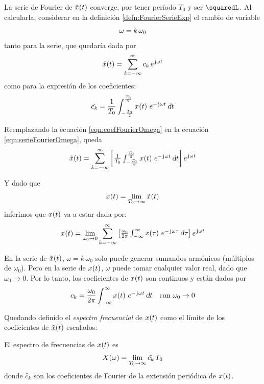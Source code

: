 La serie de Fourier de $\fx[\tilde{x}]{t}$ converge, por tener período $T_0$ y ser $\squaredL$.
Al calcularla, considerar en la definición \ref{defn:FourierSerieExp} el cambio de variable
\[
    \omega = \kth \, \omega_0
\]
tanto para la serie, que quedaría dada por
\begin{equation}
    \fx[\tilde{x}]{t}
    = \sum_{\kth=-\infty}^\infty
    c_\kth \, \complexExp
    \label{eqn:serieFourierOmega}
\end{equation}
como para la expresión de los coeficientes:
\begin{equation}
    \tilde{c_\kth} =
    \frac{1}{T_0}
    \int_{-\frac{T_0}{2}}^{\frac{T_0}{2}} \fx[x]{t} \, e^{- \iu \omega t}
    \, \dif t
    \label{eqn:coefFourierOmega}
\end{equation}

Reemplazando la ecuación \ref{eqn:coefFourierOmega} en la ecuación \ref{eqn:serieFourierOmega}, queda
\[
    \fx[\tilde{x}]{t}
    = \sum_{\kth=-\infty}^\infty
    \inBrackets{
    \frac{1}{T_0}
    \int_{-\frac{T_0}{2}}^{\frac{T_0}{2}} \fx[x]{t} \, e^{- \iu \omega t}
    \, \dif t
    }
    \, \complexExp
\]

Y dado que
\[
    \fx[x]{t} = \lim_{T_0 \to \infty} \fx[\tilde{x}]{t}
\]
inferimos que $\fx[x]{t}$ va a estar dada por:
\begin{equation}
    \fx[x]{t}
    = \lim_{\omega_0 \to 0}
    \sum_{\kth=-\infty}^\infty
    \inBrackets{ \frac{\omega_0}{2 \pi} \int_{-\infty}^{\infty} \fx[x]{\tau} \, e^{- \iu \omega \tau} \, \dif \tau }
    \, \complexExp
    \label{eqn:serieFourierNoPeriodica}
\end{equation}

En la serie de $\fx[\tilde{x}]{t}$, $\omega = k \, \omega_0$ solo puede generar sumandos armónicos (múltiplos de $\omega_0$).
Pero en la serie de $\fx[x]{t}$, $\omega$ puede tomar cualquier valor real, dado que $\omega_0 \to 0$.
Por lo tanto, los coeficientes de $\fx[x]{t}$ son continuos y están dados por
\[
    c_\kth =
    \frac{\omega_0}{2 \pi}
    \int_{-\infty}^\infty \fx[x]{t} \, e^{- \iu \omega t}
    \, \dif t
    \quad \text{con } \omega_0 \to 0
\]

Quedando definido el \emph{espectro frecuencial} de $\fx[x]{t}$ como el límite de los coeficientes de $\fx[\tilde{x}]{t}$ escalados:

\begin{mdframed}[style=DefinitionFrame]
    \begin{defn}
        \label{defn:espectroFourier}
    \end{defn}

    El espectro de frecuencias de $\fx[x]{t}$ es
    \[
        \fx[X]{\omega} = \lim_{T_0 \to \infty} \tilde{c_k} \, T_0
    \]
    donde $\tilde{c_k}$ son los coeficientes de Fourier de la extensión periódica de $\fx[x]{t}$.
\end{mdframed}

